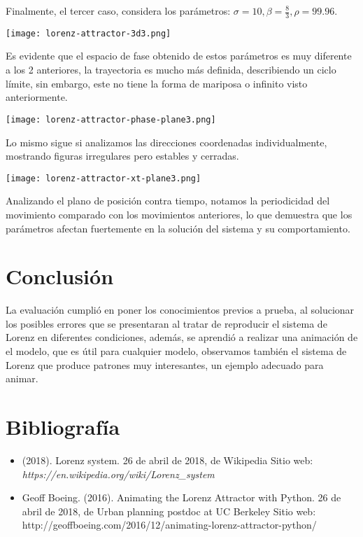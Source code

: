 \documentclass[a4paper]{article}
\begin{document}
\vspace{0.75cm}

Finalmente, el tercer caso, considera los parámetros: $\sigma = 10, \beta = \frac{8}{3}, \rho = 99.96$.

\begin{center}
	\texttt{[image: lorenz-attractor-3d3.png]}
\end{center}

Es evidente que el espacio de fase obtenido de estos parámetros es muy diferente a los 2 anteriores, la trayectoria es mucho más definida, describiendo un ciclo límite, sin embargo, este no tiene la forma de mariposa o infinito visto anteriormente.

\begin{center}
	\texttt{[image: lorenz-attractor-phase-plane3.png]}
\end{center}

Lo mismo sigue si analizamos las direcciones coordenadas individualmente, mostrando figuras irregulares pero estables y cerradas.

\begin{center}
	\texttt{[image: lorenz-attractor-xt-plane3.png]}
\end{center}

Analizando el plano de posición contra tiempo, notamos la periodicidad del movimiento comparado con los movimientos anteriores, lo que demuestra que los parámetros afectan fuertemente en la solución del sistema y su comportamiento.


\section{Conclusión}

La evaluación cumplió en poner los conocimientos previos a prueba, al solucionar los posibles errores que se presentaran al tratar de reproducir el sistema de Lorenz en diferentes condiciones, además, se aprendió a realizar una animación de el modelo, que es útil para cualquier modelo, observamos también el sistema de Lorenz que produce patrones muy interesantes, un ejemplo adecuado para animar.


\section{Bibliografía}

\begin{itemize}
\item (2018). Lorenz system. 26 de abril de 2018, de Wikipedia Sitio web: 
\textit{https://en.wikipedia.org/wiki/Lorenz\_system}

\item Geoff Boeing. (2016). Animating the Lorenz Attractor with Python. 26 de abril de 2018, de Urban planning postdoc at UC Berkeley Sitio web: 
http://geoffboeing.com/2016/12/animating-lorenz-attractor-python/
\end{itemize}
\end{document}
